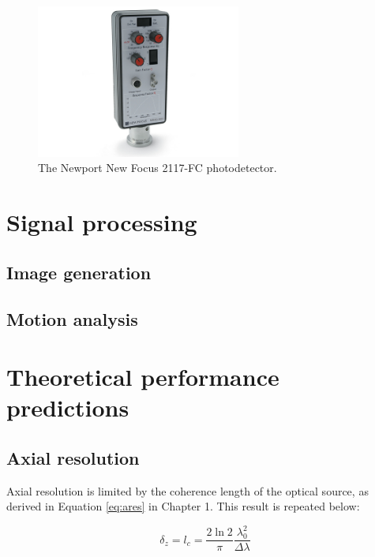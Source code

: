 \begin{figure}[h!]

\centering
\includegraphics[width=0.6\textwidth]{Images/System/pd.jpg}
\caption{The Newport New Focus 2117-FC photodetector.}
\end{figure}

\section{Signal processing}


\subsection{Image generation}

\subsection{Motion analysis}

\section{Theoretical performance predictions}

\subsection{Axial resolution}

Axial resolution is limited by the coherence length of the optical source, as derived in Equation \ref{eq:ares} in Chapter 1. This result is repeated below:

\begin{equation} \label{eq:ares2}
\delta_z = l_c = \frac{2 \ln{2}}{\pi} \frac{\lambda_0^2}{\Delta \lambda}
\end{equation}

